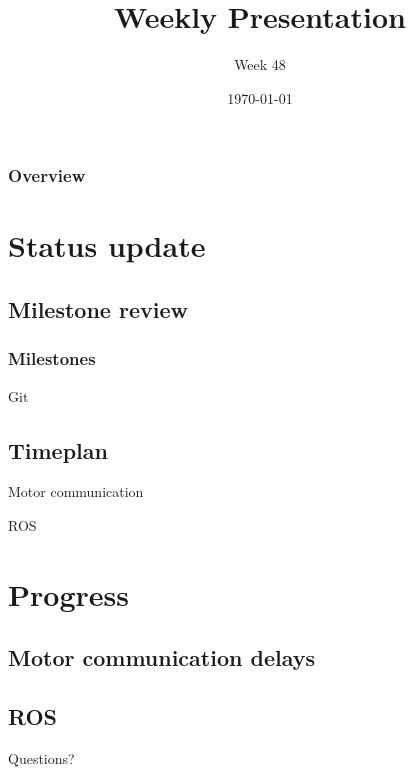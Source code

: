 \documentclass{beamer}
\title{Weekly Presentation}
\subtitle{Week 48}
\author{}
\institute{Luleå University of Technology}
\date{\today}
\begin{document}
\begin{frame}
    \titlepage
\end{frame}

\begin{frame}
    \frametitle{Overview}
    \tableofcontents
\end{frame}

\section{Status update}
\subsection{Milestone review}
\begin{frame}
    \frametitle{Milestones}
    \centering
    \Huge Git
\end{frame}
\subsection{Timeplan}


\begin{frame}
    \centering
    \Huge Motor communication
\end{frame}

\begin{frame}
    \centering
    \Huge ROS
\end{frame}


\section{Progress}
\subsection{Motor communication delays}
\subsection{ROS}








\begin{frame}
    \begin{center}
        \Huge Questions?
    \end{center}
\end{frame}
\end{document}
